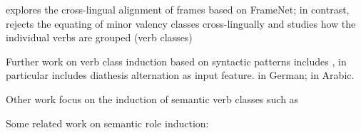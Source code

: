 \citet{baker2020, ellsworth2021} explores the cross-lingual alignment of frames based on FrameNet; in contrast, \citet{say2014} rejects the equating of minor valency classes cross-lingually and studies how the individual verbs are grouped (verb classes)

Further work on verb class induction based on syntactic patterns includes \citet{basili1993, navarretta2000, korhonen2006, sun2008, sun2009}, \citet{sun2013} in particular includes diathesis alternation as input feature. \citet{schulteimwalde2002, schulteimwalde2003, schulteimwalde2006} in German; \citet{snider2006} in Arabic.

Other work focus on the induction of semantic verb classes such as \citet{furstenau2012, majewska2018, majewska2020}

Some related work on semantic role induction: \citet{dowty1991, abend2009, titov2012, bickel2014, sayeed2018, watanabe2010, yamada2021}







